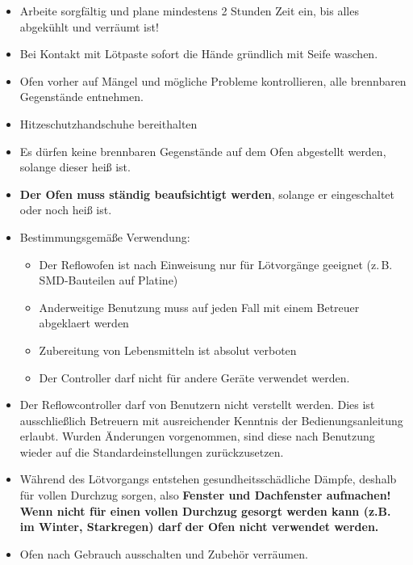 \documentclass[fontsize=11pt]{scrartcl}
\begin{document}
\begin{itemize}
	\item Arbeite sorgfältig und plane mindestens 2 Stunden Zeit ein, bis alles abgekühlt und verräumt ist!
	\item Bei Kontakt mit Lötpaste sofort die Hände gründlich mit Seife waschen.
	\item Ofen vorher auf Mängel und mögliche Probleme kontrollieren, alle brennbaren Gegenstände entnehmen.
	\item Hitzeschutzhandschuhe bereithalten
	\item Es dürfen keine brennbaren Gegenstände auf dem Ofen abgestellt werden, solange dieser heiß ist.
	\item \textbf{Der Ofen muss ständig beaufsichtigt werden}, solange er eingeschaltet oder noch heiß ist.
	\item Bestimmungsgemäße Verwendung:

\begin{itemize}
	\setlength{\itemsep}{-3pt}
	\item Der Reflowofen ist nach Einweisung nur für Lötvorgänge geeignet (z.\,B. SMD-Bauteilen auf Platine)
	\item Anderweitige Benutzung muss auf jeden Fall mit einem Betreuer abgeklaert werden
	\item Zubereitung von Lebensmitteln ist absolut verboten
	\item Der Controller darf nicht für andere Geräte verwendet werden.
\end{itemize}
	\item Der Reflowcontroller darf von Benutzern nicht verstellt werden. Dies ist ausschließlich Betreuern mit ausreichender Kenntnis der Bedienungsanleitung erlaubt. Wurden Änderungen vorgenommen, sind diese nach Benutzung wieder auf die Standardeinstellungen zurückzusetzen.
	\item Während des Lötvorgangs entstehen gesundheitsschädliche Dämpfe, deshalb für vollen Durchzug sorgen, also \textbf{Fenster und Dachfenster aufmachen! Wenn nicht für einen vollen Durchzug gesorgt werden kann (z.B. im Winter, Starkregen) darf der Ofen nicht verwendet werden.}
	\item Ofen nach Gebrauch ausschalten und Zubehör verräumen.
\end{itemize}
\end{document}
